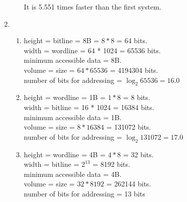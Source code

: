 \documentclass[12pt]{article}
\begin{document}
\begin{enumerate}
\begin{enumerate}
                It is 5.551 times faster than the first system.
        \end{enumerate}
    \item
        \begin{enumerate}
            \item
                height = bitline  = 8B = $8*8$ = 64 bits.\\
                width = wordline = 64 * 1024 = 65536 bits.\\
                minimum accessible data = 8B. \\
                volume = size = $64*65536$ = 4194304 bits.\\
                number of bits for addressing = $\log_2{65536}=16.0$
            \item
                height = wordline = 1B = $1*8$ = 8 bits.\\
                width = bitline = 16 * 1024 = 16384 bits.\\
                minimum accessible data = 1B. \\
                volume = size = $8*16384$ = 131072 bits.\\
                number of bits for addressing = $\log_2{131072}=17.0$
            \item
                height = wordline = 4B = $4*8$ = 32 bits.\\
                width = bitline = $2^{13}$ = 8192 bits.\\
                minimum accessible data = 4B. \\
                volume = size = $32*8192$ = 262144 bits.\\
                number of bits for addressing = 13 bits\\

        \end{enumerate}

\end{enumerate}
\end{document}
